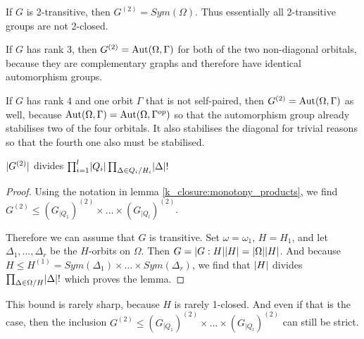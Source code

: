 \documentclass[fontsize=11pt,fleqn,a4paper]{scrartcl}
\begin{document}
\begin{example}\label{two_closure:rank_2_3_and_4}
If $G$ is 2-transitive, then $G^{(2)}=Sym(\Omega)$. Thus essentially all 2-transitive groups are not 2-closed.

\smallbreak
If $G$ has rank 3, then $G^{(2)} = \operatorname{Aut}(\Omega,\Gamma)$ for both of the two non-diagonal orbitals, because they are complementary graphs and therefore have identical automorphism groups.

\smallbreak
If $G$ has rank 4 and one orbit $\Gamma$ that is not self-paired, then $G^{(2)}=\operatorname{Aut}(\Omega,\Gamma)$ as well, because $\operatorname{Aut}(\Omega,\Gamma) = \operatorname{Aut}(\Omega,\Gamma^{op})$ so that the automorphism group already stabilises two of the four orbitals. It also stabilises the diagonal for trivial reasons so that the fourth one also must be stabilised.
\end{example}

\begin{corollary}
$\lvert G^{(2)}\rvert$ divides $\prod_{i=1}^l \lvert Q_i\rvert \prod_{\Delta \in Q_i / H_i} \lvert\Delta\rvert!$
\end{corollary}
\begin{proof}
Using the notation in lemma \ref{k_closure:monotony_products}, we find $G^{(2)} \leq (G_{|Q_1})^{(2)} \times \ldots \times (G_{|Q_l})^{(2)}$.

Therefore we can assume that $G$ is transitive. Set $\omega=\omega_1$, $H=H_1$, and let $\Delta_1,\ldots,\Delta_r$ be the $H$-orbits on $\Omega$. Then $G=\lvert G:H\rvert\lvert H\rvert = \lvert\Omega\rvert\lvert H\rvert$. And because $H\leq H^{(1)} = Sym(\Delta_1)\times \ldots\times Sym(\Delta_r)$, we find that $\lvert H\rvert$ divides $\prod_{\Delta \in \Omega/H} \lvert\Delta\rvert!$ which proves the lemma.
\end{proof}

\begin{remark}
This bound is rarely sharp, because $H$ is rarely 1-closed. And even if that is the case, then the inclusion $G^{(2)} \leq (G_{|Q_1})^{(2)} \times \ldots \times (G_{|Q_l})^{(2)}$ can still be strict.
\end{remark}
\end{document}
